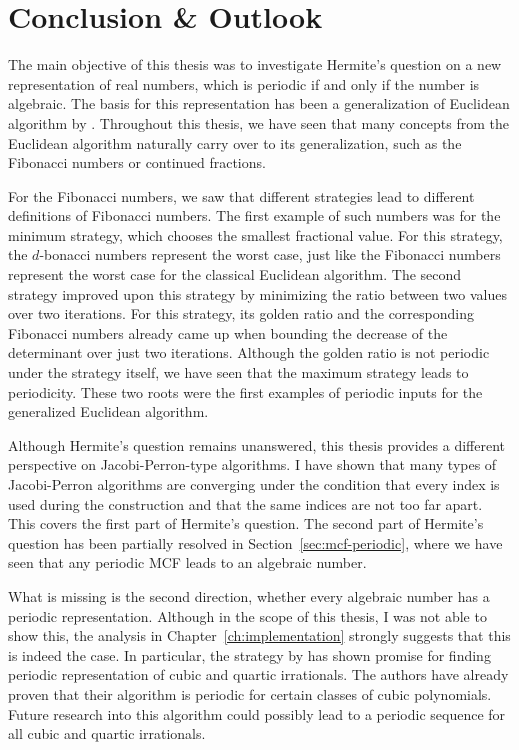 \chapter{Conclusion \& Outlook}
\label{ch:conclusion}

The main objective of this thesis
was to investigate Hermite's question
on a new representation of real numbers,
which is periodic if and only if the number is algebraic.
The basis for this representation has been a generalization of Euclidean
algorithm by \citeauthor{Klein24}.
Throughout this thesis,
we have seen that many concepts from the Euclidean algorithm naturally carry
over to its generalization, such as the Fibonacci numbers or continued
fractions.

For the Fibonacci numbers,
we saw that different strategies lead to different definitions of Fibonacci numbers.
The first example of such numbers was for the minimum strategy,
which chooses the smallest fractional value.
For this strategy, the $d$-bonacci numbers represent the worst case,
just like the Fibonacci numbers represent the worst case for the classical
Euclidean algorithm.
The second strategy improved upon this strategy by minimizing the ratio between two values over two iterations.
For this strategy, its golden ratio and the corresponding Fibonacci numbers
already came up when bounding the decrease of the determinant over just two iterations.
Although the golden ratio is not periodic under the strategy itself,
we have seen that the maximum strategy leads to periodicity.
These two roots were the first examples of periodic inputs for the generalized Euclidean algorithm.


Although Hermite's question remains unanswered,
this thesis provides a different perspective on Jacobi-Perron-type algorithms.
I have shown that many types of Jacobi-Perron algorithms are converging
under the condition that every index is used during the construction and that
the same indices are not too far apart.
This covers the first part of Hermite's question.
The second part of Hermite's question has been partially resolved in Section~\ref{sec:mcf-periodic},
where we have seen that any periodic MCF leads to an algebraic number.

What is missing is the second direction,
whether every algebraic number has a periodic representation.
Although in the scope of this thesis,
I was not able to show this,
the analysis in Chapter~\ref{ch:implementation}
strongly suggests that this is indeed the case.
In particular, the strategy by \citeauthor{Tamura09} has shown promise for
finding periodic representation of cubic and quartic irrationals.
The authors have already proven that their algorithm is periodic for certain
classes of cubic polynomials.
Future research into this algorithm could possibly lead to a periodic sequence
for all cubic and quartic irrationals.

